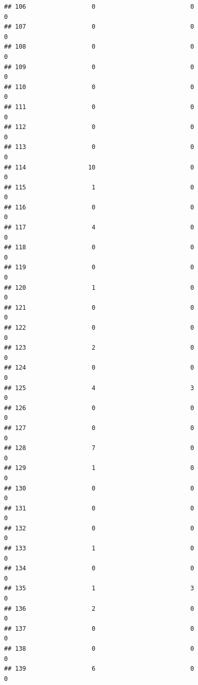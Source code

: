 \documentclass[
]{article}
\begin{document}
\begin{verbatim}
## 106                  0                          0                       0
## 107                  0                          0                       0
## 108                  0                          0                       0
## 109                  0                          0                       0
## 110                  0                          0                       0
## 111                  0                          0                       0
## 112                  0                          0                       0
## 113                  0                          0                       0
## 114                 10                          0                       0
## 115                  1                          0                       0
## 116                  0                          0                       0
## 117                  4                          0                       0
## 118                  0                          0                       0
## 119                  0                          0                       0
## 120                  1                          0                       0
## 121                  0                          0                       0
## 122                  0                          0                       0
## 123                  2                          0                       0
## 124                  0                          0                       0
## 125                  4                          3                       0
## 126                  0                          0                       0
## 127                  0                          0                       0
## 128                  7                          0                       0
## 129                  1                          0                       0
## 130                  0                          0                       0
## 131                  0                          0                       0
## 132                  0                          0                       0
## 133                  1                          0                       0
## 134                  0                          0                       0
## 135                  1                          3                       0
## 136                  2                          0                       0
## 137                  0                          0                       0
## 138                  0                          0                       0
## 139                  6                          0                       0

\end{verbatim}
\end{document}
